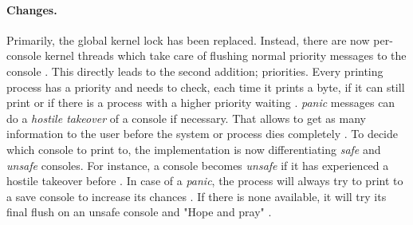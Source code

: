 \documentclass[10pt,twocolumn,a4paper]{article}
\begin{document}
\paragraph{Changes.}
Primarily, the global kernel lock has been replaced.
Instead, there are now per-console kernel threads which take care of flushing normal priority messages to the console \cite{gleixner_printk_2024}.
This directly leads to the second addition; priorities.
Every printing process has a priority and needs to check, each time it prints a byte, if it can still print or if there is a process with a higher priority waiting \cite{edge_discussion_2022}.
\emph{panic} messages can do a \emph{hostile takeover} of a console if necessary.
That allows to get as many information to the user before the system or process dies completely \cite{edge_discussion_2022}.
To decide which console to print to, the  implementation is now differentiating \emph{safe} and \emph{unsafe} consoles.
For instance, a console becomes \emph{unsafe} if it has experienced a hostile takeover before \cite{kernel_development_community_console}.
In case of a \emph{panic}, the process will always try to print to a save console to increase its chances \cite{gleixner_printk_2024}.
If there is none available, it will try its final flush on an unsafe console and "Hope and pray" \cite{kernel_development_community_console}.


\printglossaries

\printbibliography
\end{document}

